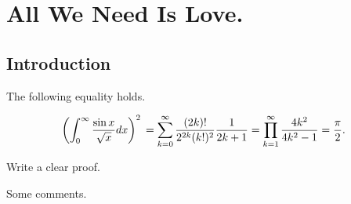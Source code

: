 \documentclass{report}
\begin{document}
\chapter{All We Need Is Love.}
\section{Introduction}
\begin{thm}
	The following equality holds.

	\begin{equation}
		\left( \int_{0}^ \infty \frac{\sin x}{\sqrt x}
		dx \right)^{2} \\
		= \sum_{k = 0}^ \infty \frac{(2k)!
		}{2^{2k}(k!)^{2}} \frac{1}{2k + 1} \\
		= \prod_{k = 1}^ \infty \frac{4k^{2}}{4k^{2} - 1} \\
		= \frac{\pi}{2}.
	\end{equation}
\end{thm}
\begin{prf}
	Write a clear proof.
\end{prf}

\begin{rem}
	Some comments.
	\fin
\end{rem}
\end{document}
